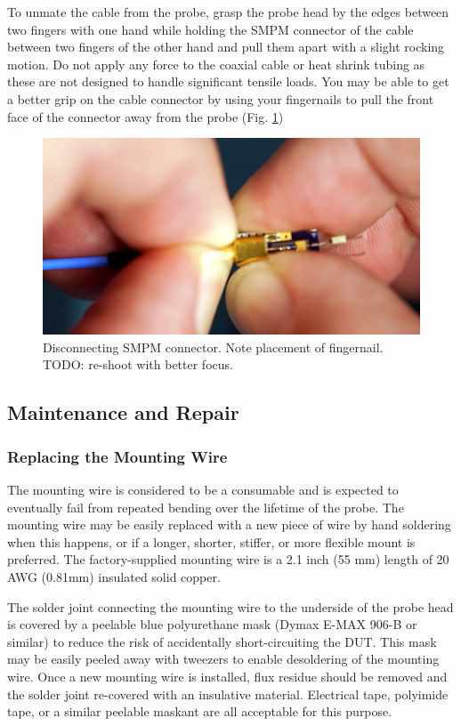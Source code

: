 \documentclass[11pt]{article}
\begin{document}
To unmate the cable from the probe, grasp the probe head by the edges between two fingers with one hand while holding
the SMPM connector of the cable between two fingers of the other hand and pull them apart with a slight rocking motion.
Do not apply any force to the coaxial cable or heat shrink tubing as these are not designed to handle significant
tensile loads. You may be able to get a better grip on the cable connector by using your fingernails to pull the front
face of the connector away from the probe (Fig. \ref{smpm-unmating})

\begin{figure}[h]
\centering
\includegraphics[width=12cm]{smpm-unmating.jpg}
\caption{Disconnecting SMPM connector. Note placement of fingernail. TODO: re-shoot with better focus.}
\label{smpm-unmating}
\end{figure}
\FloatBarrier

\subsection{Maintenance and Repair}

\subsubsection{Replacing the Mounting Wire}

The mounting wire is considered to be a consumable and is expected to eventually fail from repeated
bending over the lifetime of the probe. The mounting wire may be easily replaced with a new piece of
wire by hand soldering when this happens, or if a longer, shorter, stiffer, or more flexible mount is preferred. The
factory-supplied mounting wire is a 2.1 inch (55 mm) length of 20 AWG (0.81mm) insulated solid copper.

The solder joint connecting the mounting wire to the underside of the probe head is covered by a peelable blue
polyurethane mask (Dymax E-MAX 906-B or similar) to reduce the risk of accidentally short-circuiting the DUT. This mask
may be easily peeled away with tweezers to enable desoldering of the mounting wire. Once a new mounting wire is
installed, flux residue should be removed and the solder joint re-covered with an insulative material. Electrical tape,
polyimide tape, or a similar peelable maskant are all acceptable for this purpose.
\end{document}

